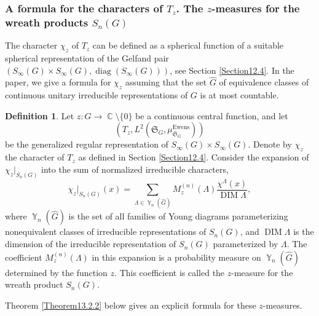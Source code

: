 \documentclass[12pt]{amsart}
\theoremstyle{definition}
\newtheorem{defn}[thm]{Definition}
\numberwithin{equation}{section}
\DeclareMathOperator{\Y}{\mathbb{Y}}
\DeclareMathOperator{\C}{\mathbb{C}}
\DeclareMathOperator{\diag}{diag}
\DeclareMathOperator{\DIM}{DIM}
\DeclareMathOperator{\Ewens}{Ewens}
\begin{document}
\subsubsection{A formula for the characters of $T_z$. The $z$-measures for the wreath products $S_{n}(G)$}
The character $\chi_z$ of $T_z$ can be defined as a spherical function of a suitable spherical representation of the Gelfand pair
$\left(S_{\infty}(G)\times S_{\infty}(G),\diag\left(S_{\infty}(G)\right)\right)$, see Section \ref{Section12.4}. In the paper, we give a formula for $\chi_z$ assuming that the set $\widehat{G}$
of equivalence classes of continuous unitary irreducible representations of $G$ is at most countable.
\begin{defn}\label{DefinitionZMES} Let $z: G\longrightarrow\C\setminus\{0\}$ be a continuous central function, and let
$$
\left(T_z,L^2\left(\mathfrak{S}_G,\mu^{\Ewens}_{\mathfrak{S}_G}\right)\right)
$$
be the generalized regular representation of $S_{\infty}(G)\times S_{\infty}(G)$.
Denote by $\chi_z$ the character of $T_z$ as defined in Section
\ref{Section12.4}. Consider the expansion of $\chi_z\vert_{S_n(G)}$
into the sum of normalized irreducible characters,
\begin{equation}\label{13.1.2}
\chi_z\vert_{S_n(G)}(x)=\sum\limits_{\Lambda\in\Y_n(\widehat{G})}
M_z^{(n)}\left(\Lambda\right)\frac{\chi^{\Lambda}(x)}{\DIM\Lambda},
\end{equation}
where $\Y_n\left(\widehat{G}\right)$ is the set of all families of Young diagrams parameterizing
nonequivalent classes of irreducible representations of $S_n(G)$,
and $\DIM\Lambda$ is the dimension of the irreducible representation of $S_n(G)$ parameterized by $\Lambda$. The coefficient $M_z^{(n)}(\Lambda)$ in
this expansion is a probability measure on $\Y_n(\widehat{G})$ determined by the function $z$. This coefficient is called the $z$-measure for the wreath product $S_n(G)$.
\end{defn}
Theorem \ref{Theorem13.2.2} below gives an explicit formula for these $z$-measures.
\end{document}
